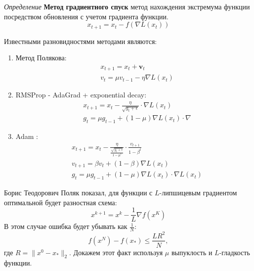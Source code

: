 \textit{Определение} \textbf{Метод градиентного спуск} метод нахождения экстремума функции
посредством обновления с учетом градиента функции.
\begin{equation}
    x_{t+1} = x_t - f(\nabla L(x_t))  
\end{equation}

Известными разновидностями методами являются:\begin{enumerate}
    \item Метод Полякова:
        \begin{equation}
            \begin{aligned}
                &x_{t+1}= x_t + \mathbf{v}_t \\
                &v_t = \mu v_{t-1} - \eta \nabla L(x_t)
            \end{aligned}
        \end{equation}
    \item RMSProp - AdaGrad + exponential decay:
        \begin{equation}
            \begin{aligned}
                &x_{t+1} = x_t - \frac{\eta}{\sqrt{g_t+\epsilon}} \cdot \nabla L(x_t) \\
                &g_t = \mu g_{t-1} + (1-\mu)\nabla L(x_t) \cdot \nabla  
            \end{aligned}
        \end{equation}
    \item Adam \cite{kingma2014adam}:
        \begin{equation}
            \begin{aligned}
                &x_{t+1} = x_t - \frac{\eta}{\frac{\sqrt{g_t+\epsilon}}{1-\mu^t}} \cdot \frac{v_{t+1}}{1-\beta^t} \\
                &v_{t+1} = \beta v_t + (1-\beta) \nabla L(x_t) \\
                &g_t = \mu g_{t-1} + (1-\mu)\nabla L(x_t) \cdot \nabla  L(x_t)
            \end{aligned}
        \end{equation}
\end{enumerate}

Борис Теодорович Поляк показал, для функции с $L$-липшицевым градиентом оптимальной будет разностная схема: 
\begin{equation}
    x^{k+1} = x^k - \frac{1}{L} \nabla f(x^K)
    \label{simple_grad}
\end{equation}
В этом случае ошибка будет убывать как $\frac{1}{N}$:
\begin{equation}
    f(x^N) -f(x_*) \le \frac{L R^2}{N},
\end{equation}
где $R=\| x^0 - x_* \|_2$. Докажем этот факт используя $\mu$ выпуклость и $L$-гладкость функции.

